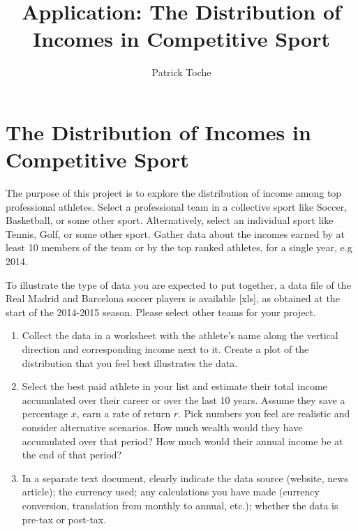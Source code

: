 \documentclass[a4,12pt]{article}%
\title{Application: The Distribution of Incomes in Competitive Sport}
\author{Patrick Toche}
\date{}
\begin{document}
\maketitle

\newpage



\section*{The Distribution of Incomes in Competitive Sport}

The purpose of this project is to explore the distribution of income among top professional athletes. Select a professional team in a collective sport like Soccer, Basketball, or some other sport. Alternatively, select an individual sport like Tennis, Golf, or some other sport. Gather data about the incomes earned by at least 10 members of the team or by the top ranked athletes, for a single year, e.g 2014. 

To illustrate the type of data you are expected to put together, a data file of the Real Madrid and Barcelona soccer players is available [xls], as obtained at the start of the 2014-2015 season. Please select other teams for your project.

\begin{enumerate}

\item 
Collect the data in a worksheet with the athlete's name along the vertical direction and corresponding income next to it. Create a plot of the distribution that you feel best illustrates the data.

\item 
Select the best paid athlete in your list and estimate their total income accumulated over their career or over the last 10 years. Assume they save a percentage $x$, earn a rate of return $r$. Pick numbers you feel are realistic and consider alternative scenarios. How much wealth would they have accumulated over that period? How much would their annual income be at the end of that period? 

\item
In a separate text document, clearly indicate the data source (website, news article); the currency used; any calculations you have made (currency conversion, translation from monthly to annual, etc.); whether the data is pre-tax or post-tax.

\end{enumerate}
\end{document}
